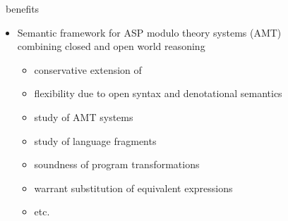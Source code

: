 \begin{frame}{\HTC\ benefits}
  \bigskip
  \begin{itemize}
  \item Semantic framework for ASP modulo theory systems (AMT)
    \\
    combining closed and open world reasoning
    \par\smallskip
    \begin{itemize}\normalsize
    \item conservative extension of \HT\
    \item flexibility due to open syntax and denotational semantics
    \item study of AMT systems
    \item study of language fragments
    \item soundness of program transformations
    \item warrant substitution of equivalent expressions
    \item etc.
    \end{itemize}
  \end{itemize}
\end{frame}
%

